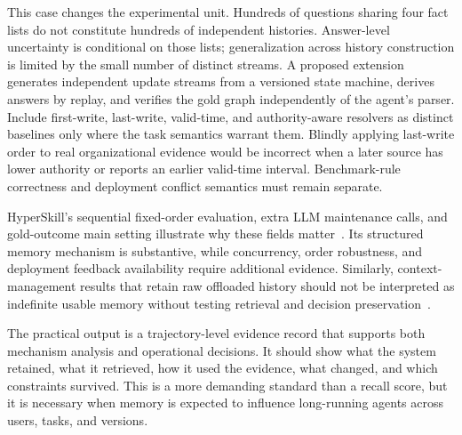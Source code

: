 This case changes the experimental unit. Hundreds of questions sharing four fact lists do not constitute hundreds of independent histories. Answer-level uncertainty is conditional on those lists; generalization across history construction is limited by the small number of distinct streams. A proposed extension generates independent update streams from a versioned state machine, derives answers by replay, and verifies the gold graph independently of the agent's parser. Include first-write, last-write, valid-time, and authority-aware resolvers as distinct baselines only where the task semantics warrant them. Blindly applying last-write order to real organizational evidence would be incorrect when a later source has lower authority or reports an earlier valid-time interval. Benchmark-rule correctness and deployment conflict semantics must remain separate.

HyperSkill's sequential fixed-order evaluation, extra LLM maintenance calls, and gold-outcome main setting illustrate why these fields matter~\cite{xu2026hyperskill}. Its structured memory mechanism is substantive, while concurrency, order robustness, and deployment feedback availability require additional evidence. Similarly, context-management results that retain raw offloaded history should not be interpreted as indefinite usable memory without testing retrieval and decision preservation~\cite{corpus260723809}.

The practical output is a trajectory-level evidence record that supports both mechanism analysis and operational decisions. It should show what the system retained, what it retrieved, how it used the evidence, what changed, and which constraints survived. This is a more demanding standard than a recall score, but it is necessary when memory is expected to influence long-running agents across users, tasks, and versions.

